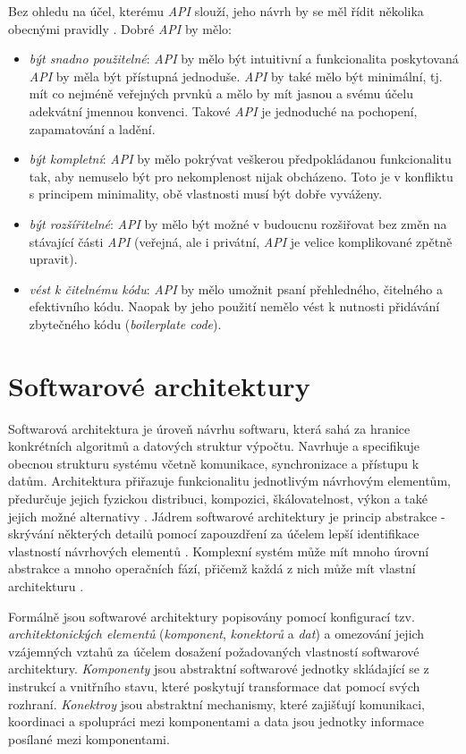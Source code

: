 Bez ohledu na účel, kterému \textit{API} slouží, jeho návrh by se měl řídit několika obecnými pravidly \cite{Bloch06}. Dobré \textit{API} by mělo:
\begin{itemize}
  \item{\textit{být snadno použitelné}}: \textit{API} by mělo být intuitivní a funkcionalita poskytovaná \textit{API} by měla být přístupná jednoduše. \textit{API} by také mělo být minimální, tj. mít co nejméně veřejných prvnků a mělo by mít jasnou a svému účelu adekvátní jmennou konvenci. Takové \textit{API} je jednoduché na pochopení, zapamatování a ladění.
  \item{\textit{být kompletní}}: \textit{API} by mělo pokrývat veškerou předpokládanou funkcionalitu tak, aby nemuselo být pro nekomplenost nijak obcházeno. Toto je v konfliktu s principem minimality, obě vlastnosti musí být dobře vyváženy.
  \item{\textit{být rozšířitelné}}: \textit{API} by mělo být možné v budoucnu rozšiřovat bez změn na stávající části \textit{API} (veřejná, ale i privátní, \textit{API} je velice komplikované zpětně upravit).
  \item{\textit{vést k čitelnému kódu}}: \textit{API} by mělo umožnit psaní přehledného, čitelného a efektivního kódu. Naopak by jeho použití nemělo vést k nutnosti přidávání zbytečného kódu (\textit{boilerplate code}).
\end{itemize}

\section{Softwarové architektury}
\label{sec:architectures}
Softwarová architektura je úroveň návrhu softwaru, která sahá za hranice konkrétních algoritmů a datových struktur výpočtu. Navrhuje a specifikuje obecnou strukturu systému včetně komunikace,
synchronizace a přístupu k datům. Architektura přiřazuje funkcionalitu jednotlivým návrhovým elementům, předurčuje jejich fyzickou distribuci, kompozici, škálovatelnost, výkon a také jejich možné alternativy \cite{Garlan94}. Jádrem softwarové architektury je princip abstrakce - skrývání některých detailů pomocí zapouzdření za účelem lepší identifikace vlastností návrhových elementů \cite{Shaw90}. Komplexní systém může mít mnoho úrovní abstrakce a mnoho operačních fází, přičemž každá z nich může mít vlastní architekturu \cite{Bass98}.

Formálně jsou softwarové architektury popisovány pomocí konfigurací tzv. \textit{architektonických elementů} (\textit{komponent}, \textit{konektorů} a \textit{dat}) a omezování jejich vzájemných vztahů za účelem dosažení požadovaných vlastností softwarové architektury. \textit{Komponenty} jsou abstraktní softwarové jednotky skládající se z instrukcí a vnitřního stavu, které poskytují transformace dat pomocí svých rozhraní. \textit{Konektroy} jsou abstraktní mechanismy, které zajišťují komunikaci, koordinaci a spolupráci mezi komponentami a data jsou jednotky informace posílané mezi komponentami. \cite{Shaw97}

